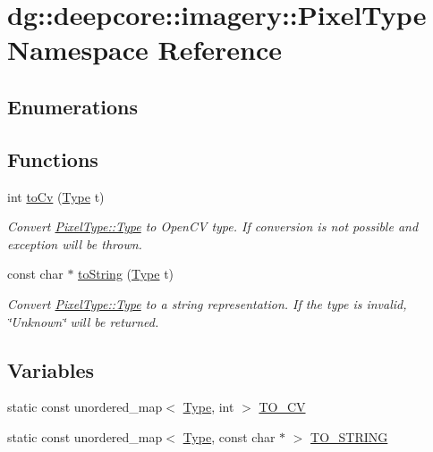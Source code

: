 \hypertarget{namespacedg_1_1deepcore_1_1imagery_1_1_pixel_type}{}\section{dg\+:\+:deepcore\+:\+:imagery\+:\+:Pixel\+Type Namespace Reference}
\label{namespacedg_1_1deepcore_1_1imagery_1_1_pixel_type}
\subsection*{Enumerations}
\subsection*{Functions}
\begin{DoxyCompactItemize}
\item 
int \hyperlink{namespacedg_1_1deepcore_1_1imagery_1_1_pixel_type_a5c8364223328bf055b8715f30f660b2e}{to\+Cv} (\hyperlink{namespacedg_1_1deepcore_1_1imagery_1_1_pixel_type_a5f0c62edf4601cbd15e52b381697069d}{Type} t)
\begin{DoxyCompactList}\small\item\em Convert \hyperlink{namespacedg_1_1deepcore_1_1imagery_1_1_pixel_type_a5f0c62edf4601cbd15e52b381697069d}{Pixel\+Type\+::\+Type} to Open\+CV type. If conversion is not possible and exception will be thrown. \end{DoxyCompactList}\item 
const char $\ast$ \hyperlink{namespacedg_1_1deepcore_1_1imagery_1_1_pixel_type_ac0a9ad478abe8c677b0b9b63f07f225b}{to\+String} (\hyperlink{namespacedg_1_1deepcore_1_1imagery_1_1_pixel_type_a5f0c62edf4601cbd15e52b381697069d}{Type} t)
\begin{DoxyCompactList}\small\item\em Convert \hyperlink{namespacedg_1_1deepcore_1_1imagery_1_1_pixel_type_a5f0c62edf4601cbd15e52b381697069d}{Pixel\+Type\+::\+Type} to a string representation. If the type is invalid, \char`\"{}\+Unknown\char`\"{} will be returned. \end{DoxyCompactList}\end{DoxyCompactItemize}
\subsection*{Variables}
\begin{DoxyCompactItemize}
\item 
static const unordered\+\_\+map$<$ \hyperlink{namespacedg_1_1deepcore_1_1imagery_1_1_pixel_type_a5f0c62edf4601cbd15e52b381697069d}{Type}, int $>$ \hyperlink{namespacedg_1_1deepcore_1_1imagery_1_1_pixel_type_af471f5ac46ba2d6163f67caa18c31dff}{T\+O\+\_\+\+CV}
\item 
static const unordered\+\_\+map$<$ \hyperlink{namespacedg_1_1deepcore_1_1imagery_1_1_pixel_type_a5f0c62edf4601cbd15e52b381697069d}{Type}, const char $\ast$ $>$ \hyperlink{namespacedg_1_1deepcore_1_1imagery_1_1_pixel_type_a6e6a3ab79dad14be632563ba115e35f1}{T\+O\+\_\+\+S\+T\+R\+I\+NG}
\end{DoxyCompactItemize}



